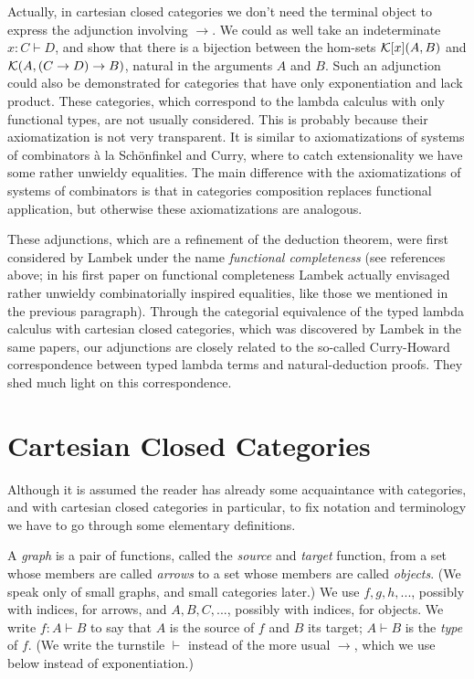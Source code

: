 Actually, in cartesian closed categories we don't need the terminal object
to express the adjunction involving $\rightarrow $. We could as well take an
indeterminate $x:C\vdash D$, and show that there is a bijection between the
hom-sets ${\cal K}[x](A,B)$ and ${\cal K}(A,(C\rightarrow D)\rightarrow B)$,
natural in the arguments $A$ and $B$. Such an adjunction could also be
demonstrated for categories that have only exponentiation and lack product.
These categories, which correspond to the lambda calculus with only
functional types, are not usually considered. This is probably because their
axiomatization is not very transparent. It is similar to axiomatizations of
systems of combinators \`{a} la Sch\"{o}nfinkel and Curry, where to catch
extensionality we have some rather unwieldy equalities. The main difference
with the axiomatizations of systems of combinators is that in categories
composition replaces functional application, but otherwise these
axiomatizations are analogous.

These adjunctions, which are a refinement of the deduction theorem, were
first considered by Lambek under the name {\it functional completeness} (see
references above; in his first paper on functional completeness \cite{Lam72}
Lambek actually envisaged rather unwieldy combinatorially inspired
equalities, like those we mentioned in the previous paragraph). Through the
categorial equivalence of the typed lambda calculus with cartesian closed
categories, which was discovered by Lambek in the same papers, our
adjunctions are closely related to the so-called Curry-Howard correspondence
between typed lambda terms and natural-deduction proofs. They shed much
light on this correspondence.

\section{Cartesian Closed Categories}

\noindent Although it is assumed the reader has already some acquaintance
with categories, and with cartesian closed categories in particular, to fix
notation and terminology we have to go through some elementary definitions.

A {\it graph} is a pair of functions, called the {\it source} and {\it target%
} function, from a set whose members are called {\it arrows} to a set whose
members are called {\it objects}. (We speak only of small graphs, and small
categories later.) We use $f,g,h,...$, possibly with indices, for arrows,
and $A,B,C,...$, possibly with indices, for objects. We write $f:A\vdash B$
to say that $A$ is the source of $f$ and $B$ its target; $A\vdash B$ is the 
{\it type} of $f$. (We write the turnstile $\vdash $ instead of the more
usual $\rightarrow $, which we use below instead of exponentiation.)

